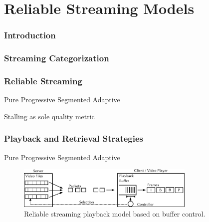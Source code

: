 \documentclass{beamer}
\begin{document}
\section{Reliable Streaming Models}

\begin{frame}
	\frametitle{Introduction}
\end{frame}


\begin{frame}
	\frametitle{Streaming Categorization}
\end{frame}


\begin{frame}
	\frametitle{Reliable Streaming}

	Pure Progressive
	Segmented
	Adaptive

	Stalling as sole quality metric
\end{frame}



\begin{frame}
	\frametitle{Playback and Retrieval Strategies}

	Pure Progressive
	Segmented
	Adaptive
	\begin{figure}

	\includegraphics[height=2cm]{../../chapters/03-streaming/images/playback-model.pdf}
	\caption{Reliable streaming playback model based on buffer control.}
	\end{figure}

\end{frame}
\end{document}
